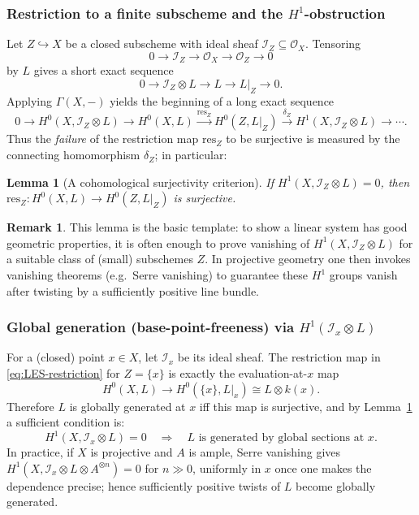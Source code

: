 \documentclass[11pt]{article}
\theoremstyle{definition}
\newtheorem{remark}[definition]{Remark}
\theoremstyle{plain}
\newtheorem{lemma}[definition]{Lemma}
\begin{document}
\subsubsection{Restriction to a finite subscheme and the $H^1$-obstruction}

Let $Z\hookrightarrow X$ be a closed subscheme with ideal sheaf $\mathcal{I}_Z\subseteq \mathcal{O}_X$. Tensoring
\[
0\to \mathcal{I}_Z \to \mathcal{O}_X \to \mathcal{O}_Z \to 0
\]
by $L$ gives a short exact sequence
\begin{equation}\label{eq:IZL}
0 \longrightarrow \mathcal{I}_Z\otimes L \longrightarrow L \longrightarrow L|_Z \longrightarrow 0.
\end{equation}
Applying $\Gamma(X,-)$ yields the beginning of a long exact sequence
\begin{equation}\label{eq:LES-restriction}
0 \to H^0(X,\mathcal{I}_Z\!\otimes L) \to H^0(X,L) \xrightarrow{\mathrm{res}_Z} H^0(Z,L|_Z)
\xrightarrow{\delta_Z} H^1(X,\mathcal{I}_Z\!\otimes L) \to \cdots.
\end{equation}
Thus the \emph{failure} of the restriction map $\mathrm{res}_Z$ to be surjective is measured by the connecting homomorphism $\delta_Z$; in particular:

\begin{lemma}[A cohomological surjectivity criterion]\label{lem:H1-surj}
If $H^1(X,\mathcal{I}_Z\otimes L)=0$, then $\mathrm{res}_Z:H^0(X,L)\to H^0(Z,L|_Z)$ is surjective.
\end{lemma}

\begin{remark}
This lemma is the basic template: to show a linear system has good geometric properties, it is often enough to prove vanishing of $H^1(X,\mathcal{I}_Z\otimes L)$ for a suitable class of (small) subschemes $Z$.
In projective geometry one then invokes vanishing theorems (e.g.\ Serre vanishing) to guarantee these $H^1$ groups vanish after twisting by a sufficiently positive line bundle.
\end{remark}

\subsubsection{Global generation (base-point-freeness) via $H^1(\mathcal{I}_x\otimes L)$}

For a (closed) point $x\in X$, let $\mathcal{I}_x$ be its ideal sheaf. The restriction map in \eqref{eq:LES-restriction} for $Z=\{x\}$ is exactly the evaluation-at-$x$ map
\[
H^0(X,L) \longrightarrow H^0(\{x\},L|_x)\cong L\otimes k(x).
\]
Therefore $L$ is globally generated at $x$ iff this map is surjective, and by Lemma~\ref{lem:H1-surj} a sufficient condition is:
\[
H^1(X,\mathcal{I}_x\otimes L)=0 \quad \Rightarrow \quad
\text{$L$ is generated by global sections at $x$.}
\]
In practice, if $X$ is projective and $A$ is ample, Serre vanishing gives
$H^1(X,\mathcal{I}_x\otimes L\otimes A^{\otimes n})=0$ for $n\gg 0$, uniformly in $x$ once one makes the dependence precise; hence sufficiently positive twists of $L$ become globally generated.
\end{document}
